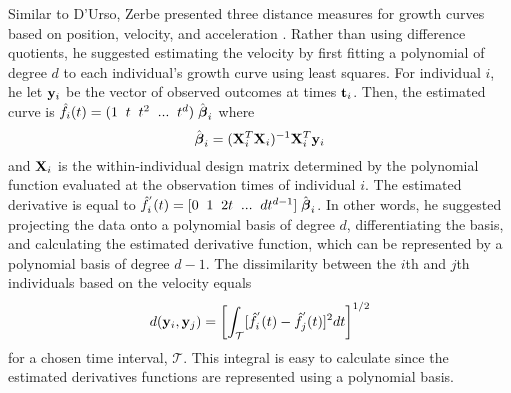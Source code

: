 Similar to D'Urso, Zerbe presented three distance measures for growth curves based on position, velocity, and acceleration \cite{zerbe1979,schneiderman1993}. Rather than using difference quotients, he suggested estimating the velocity by first fitting a polynomial of degree $d$ to each individual's growth curve using least squares. For individual $i$, he let $\mathbf y_{i}$ be the vector of observed outcomes at times $\mathbf t_{i}$. Then, the estimated curve is $\hat{f}_{i}(t) = (1\;\; t\;\;t^{2}\;\;...\;\;t^{d})\;\hat{\boldsymbol\beta}_{i}$ where 
$$\hat{\boldsymbol\beta}_{i} = (\mathbf X^{T}_{i}\mathbf X_{i})^{-1}\mathbf X^{T}_{i}\mathbf y_{i}$$
and $\mathbf X_{i}$ is the within-individual design matrix determined by the polynomial function evaluated at the observation times of individual $i$. The estimated derivative is equal to
$\hat{f}_{i}^{'}(t) = [0\;\; 1\;\;2t\;\;...\;\;dt^{d-1}]\;\hat{\boldsymbol\beta}_{i}$. In other words, he suggested projecting the data onto a polynomial basis of degree $d$, differentiating the basis, and calculating the estimated derivative function, which can be represented by a polynomial basis of degree $d-1$. The dissimilarity between the $i$th and $j$th individuals based on the velocity equals
$$d(\mathbf y_{i},\mathbf y_{j}) =\left[ \int_{\mathcal{T}} [\hat{f}^{'}_{i}(t)-\hat{f}^{'}_{j}(t)]^{2}dt\right]^{1/2}$$
for a chosen time interval, $\mathcal{T}$. This integral is easy to calculate since the estimated derivatives functions are represented using a polynomial basis.

